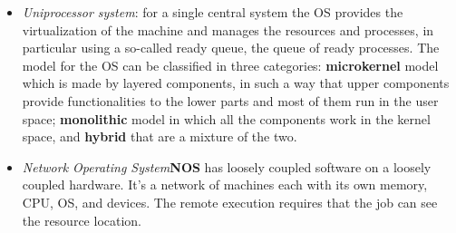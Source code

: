 \begin{itemize}
    \item \textit{Uniprocessor system}: for a single central system the OS provides the virtualization of the machine and manages the resources and processes, in particular using a so-called ready queue, the queue of ready processes. The model for the OS can be classified in three categories: \textbf{microkernel} model which is made by layered components, in such a way that upper components provide functionalities to the lower parts and most of them run in the user space; \textbf{monolithic} model in which all the components work in the kernel space, and \textbf{hybrid} that are a mixture of the two. 
    
    \item \textit{Network Operating System}\textbf{NOS} has loosely coupled software on a loosely coupled hardware. It’s a network of machines each with its own memory, CPU, OS, and devices. The remote execution requires that the job can see the resource location.
    

\end{itemize}
